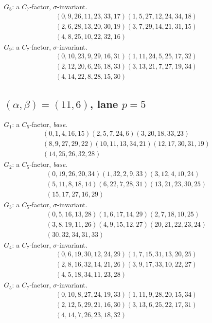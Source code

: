 \documentclass[11pt]{amsart}
\begin{document}
\smallskip\noindent $G_{8}$: a $C_7$-factor, $\sigma$-invariant.
\begin{gather*}
  (0,9,26,11,23,33,17)(1,5,27,12,24,34,18) \\
  (2,6,28,13,20,30,19)(3,7,29,14,21,31,15) \\
  (4,8,25,10,22,32,16)
\end{gather*}
\smallskip\noindent $G_{9}$: a $C_7$-factor, $\sigma$-invariant.
\begin{gather*}
  (0,10,23,9,29,16,31)(1,11,24,5,25,17,32) \\
  (2,12,20,6,26,18,33)(3,13,21,7,27,19,34) \\
  (4,14,22,8,28,15,30)
\end{gather*}
\subsection*{$(\alpha,\beta)=(11,6)$, lane $p=5$}
\smallskip\noindent $G_{1}$: a $C_5$-factor, \emph{base}.
\begin{gather*}
  (0,1,4,16,15)(2,5,7,24,6)(3,20,18,33,23) \\
  (8,9,27,29,22)(10,11,13,34,21)(12,17,30,31,19) \\
  (14,25,26,32,28)
\end{gather*}
\smallskip\noindent $G_{2}$: a $C_5$-factor, \emph{base}.
\begin{gather*}
  (0,19,26,20,34)(1,32,2,9,33)(3,12,4,10,24) \\
  (5,11,8,18,14)(6,22,7,28,31)(13,21,23,30,25) \\
  (15,17,27,16,29)
\end{gather*}
\smallskip\noindent $G_{3}$: a $C_5$-factor, $\sigma$-invariant.
\begin{gather*}
  (0,5,16,13,28)(1,6,17,14,29)(2,7,18,10,25) \\
  (3,8,19,11,26)(4,9,15,12,27)(20,21,22,23,24) \\
  (30,32,34,31,33)
\end{gather*}
\smallskip\noindent $G_{4}$: a $C_7$-factor, $\sigma$-invariant.
\begin{gather*}
  (0,6,19,30,12,24,29)(1,7,15,31,13,20,25) \\
  (2,8,16,32,14,21,26)(3,9,17,33,10,22,27) \\
  (4,5,18,34,11,23,28)
\end{gather*}
\smallskip\noindent $G_{5}$: a $C_7$-factor, $\sigma$-invariant.
\begin{gather*}
  (0,10,8,27,24,19,33)(1,11,9,28,20,15,34) \\
  (2,12,5,29,21,16,30)(3,13,6,25,22,17,31) \\
  (4,14,7,26,23,18,32)
\end{gather*}
\end{document}
